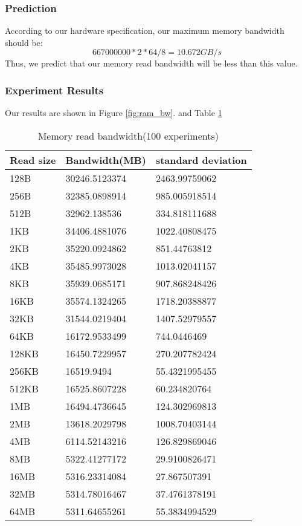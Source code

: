 \documentclass{article} %
\begin{document}
\subsubsection{Prediction}
According to our hardware specification, our maximum memory bandwidth should be:\\
$$ 667000000 * 2 * 64 / 8 = 10.672GB/s $$
Thus, we predict that our memory read bandwidth will be less than this value.\\

\subsubsection{Experiment Results}
Our results are shown in Figure \ref{fig:ram_bw}. and Table \ref{table:mem_bw} \\

\begin{table}
	\begin{center}
  \caption{Memory read bandwidth(100 experiments)}
  \begin{tabular}{|l|l|l|}
  \hline
Read size& Bandwidth(MB)& standard deviation \\  \hline
128B  & 30246.5123374 & 2463.99759062 \\  \hline
256B  & 32385.0898914 & 985.005918514 \\  \hline
512B  & 32962.138536  & 334.818111688 \\  \hline
1KB   & 34406.4881076 & 1022.40808475 \\  \hline
2KB   & 35220.0924862 & 851.44763812 \\  \hline
4KB   & 35485.9973028 & 1013.02041157 \\  \hline
8KB   & 35939.0685171 & 907.868248426 \\  \hline
16KB  & 35574.1324265 & 1718.20388877 \\  \hline
32KB  & 31544.0219404 & 1407.52979557 \\  \hline
64KB  & 16172.9533499 & 744.0446469 \\  \hline
128KB & 16450.7229957 & 270.207782424 \\  \hline
256KB & 16519.9494    & 55.4321995455 \\  \hline
512KB & 16525.8607228 & 60.234820764 \\  \hline
1MB   & 16494.4736645 & 124.302969813 \\  \hline
2MB   & 13618.2029798 & 1008.70403144 \\  \hline
4MB   & 6114.52143216 & 126.829869046 \\  \hline
8MB   & 5322.41277172 & 29.9100826471 \\  \hline
16MB  & 5316.23314084 & 27.867507391 \\  \hline
32MB  & 5314.78016467 & 37.4761378191 \\  \hline
64MB  & 5311.64655261 & 55.3834994529 \\  \hline
  \end{tabular}
\label{table:mem_bw}
\end{center}
\end{table}
\end{document}
